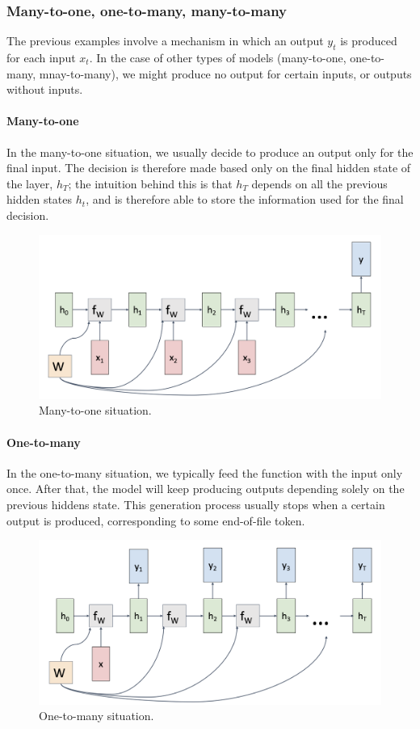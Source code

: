 \subsubsection{Many-to-one, one-to-many, many-to-many}
The previous examples involve a mechanism in which an output $y_t$ is produced for each input $x_t$. In the case of other types of models (many-to-one, one-to-many, mnay-to-many), we might produce no output for certain inputs, or outputs without inputs.

\paragraph*{Many-to-one}
In the many-to-one situation, we usually decide to produce an output only for the final input. The decision is therefore made based only on the final hidden state of the layer, $h_T$; the intuition behind this is that $h_T$ depends on all the previous hidden states $h_t$, and is therefore able to store the information used for the final decision. 
\begin{figure}[H]
    \centering
    \includegraphics[width=.7\textwidth]{images/rnn-many-to-one.png}
    \caption{Many-to-one situation.}
\end{figure}

\paragraph*{One-to-many}
In the one-to-many situation, we typically feed the function with the input only once. After that, the model will keep producing outputs depending solely on the previous hiddens state. This generation process usually stops when a certain output is produced, corresponding to some end-of-file token. 
\begin{figure}[H]
    \centering
    \includegraphics[width=.7\textwidth]{images/rnn-one-to-many.png}
    \caption{One-to-many situation.}
\end{figure}

